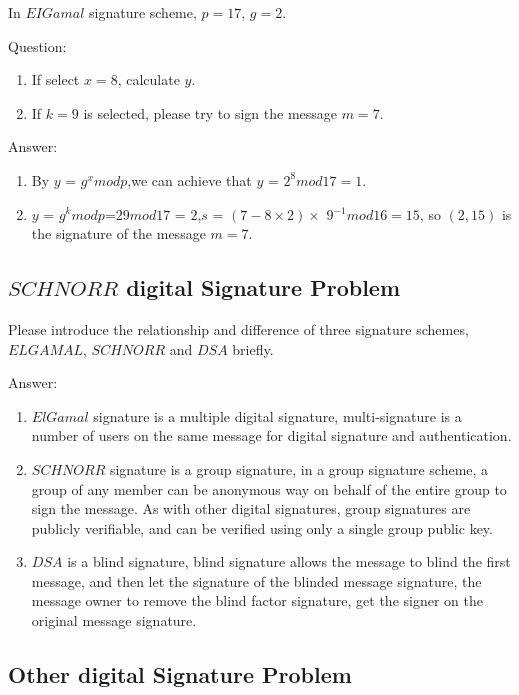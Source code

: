 \documentclass[paper=a4, fontsize=11pt]{scrartcl} %
\numberwithin{equation}{section} %
\numberwithin{figure}{section} %
\numberwithin{table}{section} %
\begin{document}
In $EIGamal$ signature scheme, $p = 17$, $g = 2$.

Question:
\begin{enumerate}
\item If select $x = 8$, calculate $y$.
\item If $k = 9$ is selected, please try to sign the message $m = 7$.
\end{enumerate}

Answer:
\begin{enumerate}
\item By $y$ = $g^x mod p$,we can achieve that $y$ = $2^8 mod 17 =1$.
\item $y$ = $g^k mod p$=$29 mod 17$ = $2$,$s$ = $(7-8 \times 2) \times$ $9$$^{-1} mod 16=15$, so $(2,15)$ is the signature of the message $m = 7$.
\end{enumerate}


\subsection{$SCHNORR$ digital Signature Problem \uppercase\expandafter{}}

Please introduce the relationship and difference of three signature schemes, $ELGAMAL$, $SCHNORR$ and $DSA$ briefly.

Answer:
\begin{enumerate}
\item $ElGamal$ signature is a multiple digital signature, multi-signature is a number of users on the same message for digital signature and authentication.
\item $SCHNORR$ signature is a group signature, in a group signature scheme, a group of any member can be anonymous way on behalf of the entire group to sign the message. As with other digital signatures, group signatures are publicly verifiable, and can be verified using only a single group public key.
\item $DSA$ is a blind signature, blind signature allows the message to blind the first message, and then let the signature of the blinded message signature, the message owner to remove the blind factor signature, get the signer on the original message signature.
\end{enumerate}


\subsection{Other digital Signature Problem \uppercase\expandafter{}}
\end{document}
